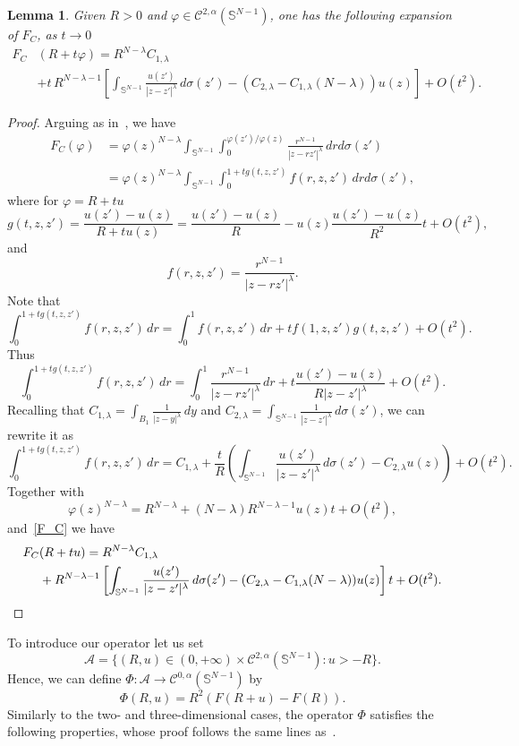 \documentclass[10pt,reqno,english]{amsart}
\newcommand{\Sn}{\mathbb{S}^{N-1}}
\newcommand{\be}{\begin{equation}}
\newcommand{\ee}{\end{equation}}
\newtheorem{lemma}{Lemma}[section]
\theoremstyle{definition}
\numberwithin{equation}{section}
\begin{document}
\begin{lemma}
Given $R>0$ and $\varphi\in\mathcal C^{2,\alpha}(\mathbb S^{N-1})$, one has the following expansion of $F_C$, as $t\to0$
     \begin{align*}
    F_C&(R+t\varphi)=R^{N-\lambda}C_{1,\lambda}\\
    &+t\,R^{N-\lambda-1}\left[\int_{\mathbb S^{N-1}}\frac{u(z')}{|z-z'|^\lambda}\,d\sigma(z')-(C_{2,\lambda}-C_{1,\lambda}(N-\lambda))u(z)\right]+O(t^2).
    \end{align*}
\end{lemma}
\begin{proof}
Arguing as in~\cite[Lemma 15]{Fr19}, we have
\be
\begin{split}
\label{F_C}
    F_C(\varphi)&=\varphi(z)^{N-\lambda}\int_{\mathbb S^{N-1}}\int_0^{\varphi(z')/\varphi(z)}\frac{r^{N-1}}{|z-rz'|^\lambda}\,drd\sigma(z')\\
        &=\varphi(z)^{N-\lambda}\int_{\mathbb S^{N-1}}\int_0^{1+tg(t,z,z')}f(r,z,z')\,drd\sigma(z'),
    \end{split}
    \ee
    where for $\varphi=R+tu$
    \[
    g(t,z,z')=\frac{u(z')-u(z)}{R+tu(z)}=\frac{u(z')-u(z)}{R}-u(z)\frac{u(z')-u(z)}{R^2}t+O(t^2),
    \]
    and
    \[
    f(r,z,z')=\frac{r^{N-1}}{|z-rz'|^\lambda}.
    \]
Note that
\[
\int_0^{1+tg(t,z,z')}f(r,z,z')\,dr=\int_0^1f(r,z,z')\,dr+tf(1,z,z')g(t,z,z')+ O(t^2).
\]
Thus
\[
\int_0^{1+tg(t,z,z')}f(r,z,z')\,dr=\int_0^1\frac{r^{N-1}}{|z-rz'|^\lambda}\,dr+t\frac{u(z')-u(z)}{R{|z-z'|^\lambda}}+O(t^2).
\]
Recalling that $C_{1,\lambda} =\int_{B_1}\frac{1}{|z-y|^\lambda}\,dy$ and $C_{2, \lambda}=\int_{\mathbb S^{N-1}}\frac{1}{|z-z'|^\lambda}\,d\sigma(z')$, we can rewrite it as
\[
\int_0^{1+tg(t,z,z')}f(r,z,z')\,dr=C_{1,\lambda}+\frac{t}{R}\left(\int_{\mathbb{S}^{N-1}}\frac{u(z')}{|z-z'|^\lambda}\,d\sigma(z')-C_{2,\lambda}u(z)\right)+O(t^2).
\]
Together with
\[
\varphi(z)^{N-\lambda}=R^{N-\lambda}+(N-\lambda)R^{N-\lambda-1}u(z)t+O(t^2),
\]
and~\eqref{F_C} we have
    \begin{align*}
        F_C&(R+tu)=R^{N-\lambda}C_{1,\lambda}\\
        &+R^{N-\lambda-1}\left[\int_{\mathbb S^{N-1}}\frac{u(z')}{|z-z'|^\lambda}\,d\sigma(z')-(C_{2,\lambda}-C_{1,\lambda}(N-\lambda))u(z)\right]t+O(t^2).\qedhere
    \end{align*}
\end{proof}





To introduce our operator let us set
\[
\mathcal A=\{(R,u)\in(0,+\infty)\times\mathcal C^{2,\alpha}(\Sn):u>-R\}.
\]
Hence, we can define $\Phi:\mathcal A\to\mathcal C^{0,\alpha}(\Sn)$ by
\[
\Phi(R,u)= R^2 \left( F(R+u)-F(R) \right).
\]
Similarly to the two- and three-dimensional cases, the operator $\Phi$ satisfies the following properties, whose proof follows the same lines as~\cite[Proposition 7 and 8]{Fr19}.
\end{document}
